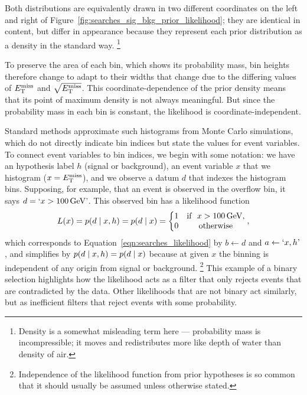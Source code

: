 Both distributions are equivalently drawn in two different coordinates
on the left and right of Figure~\ref{fig:searches_sig_bkg_prior_likelihood};
they are identical in content, but differ in appearance because they represent
each prior distribution as a density in the standard way.%
\footnote{%
Density is a somewhat misleading term here ---
probability mass is incompressible; it moves and redistributes more like
depth of water than density of air.%
}

To preserve the area of each bin, which shows its probability mass,
bin heights therefore change to adapt to their widths that change due to the
differing values of $\met$ and $\sqrt{\met}$.
This coordinate-dependence of the prior density means that its point of
maximum density is not always meaningful.
But since the probability mass in each bin is constant, the likelihood is
coordinate-independent.

Standard methods approximate such histograms from Monte Carlo simulations,
which do not directly indicate bin indices but state the values for event
variables.
To connect event variables to bin indices, we begin with some notation:
we have an hypothesis label $h$ (signal or background),
an event variable $x$ that we histogram ($x = \met$),
and we observe a datum $d$ that indexes the histogram bins.
Supposing, for example, that an event is observed in the overflow bin, it says
$d = `x > 100\,\eV[G]\textrm{'}$.
This observed bin has a likelihood function
\begin{equation}
L(x) = \prob{d}{x, h} = \prob{d}{x} =
\left\{
\begin{matrix}
1 & \textrm{if }~x > 100\,\eV[G], \\
0 & \textrm{otherwise} \\
\end{matrix}
\right.
,
\end{equation}
which corresponds to Equation~\ref{eqn:searches_likelihood} by
$b \leftarrow d$ and $a \leftarrow `x, h\textrm{'}$,
and simplifies by $\prob{d}{x, h} = \prob{d}{x}$ because at given $x$ the
binning is independent of any origin from signal or background.%
\footnote{%
Independence of the likelihood function from prior hypotheses is so common
that it should usually be assumed unless otherwise stated.
}
This example of a binary selection highlights how the likelihood acts as a
filter that only rejects events that are contradicted by the data.
Other likelihoods that are not binary act similarly, but as inefficient filters
that reject events with some probability.

